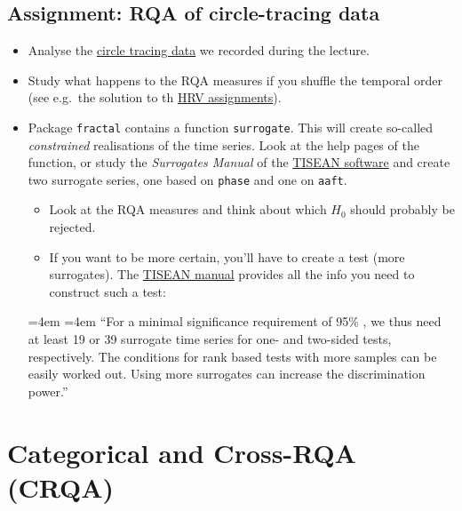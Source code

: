 \documentclass[]{book}
\providecommand{\tightlist}{%
  \setlength{\itemsep}{0pt}\setlength{\parskip}{0pt}}
\renewenvironment{quote}{%
  \par \small \medskip \block
  \leftskip=4em \rightskip=4em%
  \noindent \ignorespaces}{%
  \par \medskip
  }
\let\stdsection\section
\renewcommand\section{\newpage\stdsection}
\begin{document}
\section{Assignment: RQA of circle-tracing
data}\label{assignment-rqa-of-circle-tracing-data}

\begin{itemize}
\tightlist
\item
  Analyse the
  \href{https://github.com/FredHasselman/DCS/tree/master/assignmentData/RQA_circletrace}{circle
  tracing data} we recorded during the lecture.
\item
  Study what happens to the RQA measures if you shuffle the temporal
  order (see e.g.~the solution to th \protect\hyperlink{hrvsol}{HRV
  assignments}).
\item
  Package \texttt{fractal} contains a function \texttt{surrogate}. This
  will create so-called \emph{constrained} realisations of the time
  series. Look at the help pages of the function, or study the
  \emph{Surrogates Manual} of the
  \href{http://www.mpipks-dresden.mpg.de/~tisean/Tisean_3.0.1/index.html}{TISEAN
  software} and create two surrogate series, one based on \texttt{phase}
  and one on \texttt{aaft}.

  \begin{itemize}
  \tightlist
  \item
    Look at the RQA measures and think about which \(H_0\) should
    probably be rejected.
  \item
    If you want to be more certain, you'll have to create a test (more
    surrogates). The
    \href{http://www.mpipks-dresden.mpg.de/~tisean/Tisean_3.0.1/docs/surropaper/node5.html\#SECTION00030000000000000000}{TISEAN
    manual} provides all the info you need to construct such a test:
  \end{itemize}

  \begin{quote}
  ``For a minimal significance requirement of 95\% , we thus need at
  least 19 or 39 surrogate time series for one- and two-sided tests,
  respectively. The conditions for rank based tests with more samples
  can be easily worked out. Using more surrogates can increase the
  discrimination power.''
  \end{quote}
\end{itemize}

\chapter{\texorpdfstring{\textbf{Categorical and Cross-RQA
(CRQA)}}{Categorical and Cross-RQA (CRQA)}}\label{CRQA}
\end{document}
